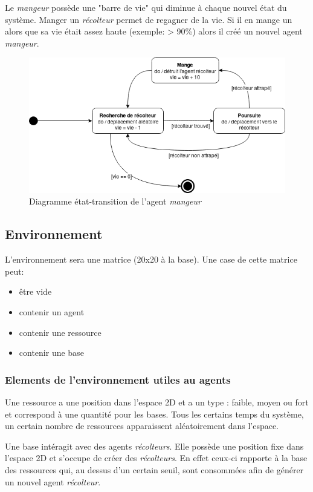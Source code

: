 \documentclass{article}
\begin{document}
Le \emph{mangeur} possède une "barre de vie" qui diminue à chaque nouvel état du système.
Manger un \emph{récolteur} permet de regagner de la vie. Si il en mange un alors que sa
vie était assez haute (exemple: > 90\%) alors il créé un nouvel agent \emph{mangeur}.

\begin{figure}[!ht]
  \centering
  \caption{Diagramme état-transition de l'agent \emph{mangeur}}
  \includegraphics[scale=0.70]{img/etat-transition_mangeur.png}
\end{figure}

\subsection{Environnement}
L'environnement sera une matrice (20x20 à la base). Une case de cette matrice peut:
\begin{itemize}
  \item être vide
  \item contenir un agent
  \item contenir une ressource
  \item contenir une base
\end{itemize}

\subsubsection{Elements de l'environnement utiles au agents}

Une ressource a une position dans l'espace 2D et a un type : faible, moyen ou fort et
correspond à une quantité pour les bases. Tous les certains temps du système, un certain
nombre de ressources apparaissent aléatoirement dans l'espace.

Une base intéragit avec des agents \emph{récolteurs}. Elle possède une position fixe
dans l'espace 2D et s'occupe de créer des \emph{récolteurs}. En effet ceux-ci rapporte
à la base des ressources qui, au dessus d'un certain seuil, sont consommées afin de
générer un nouvel agent \emph{récolteur}.
\end{document}
